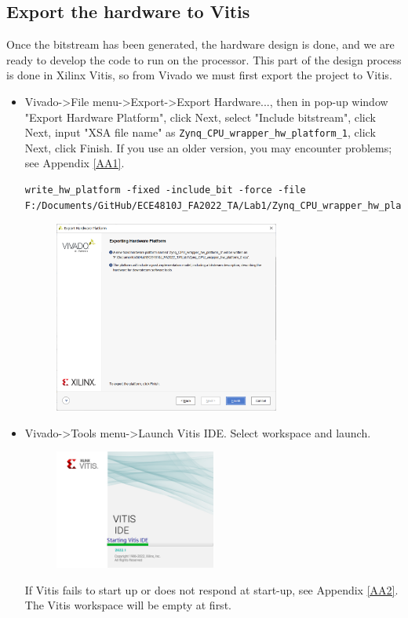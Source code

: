 \documentclass[a4paper,12pt,twoside]{article}
\begin{document}
\subsection{Export the hardware to Vitis}
Once the bitstream has been generated, the hardware design is done, and we are ready to develop the code to run on the processor. This part of the design process is done in Xilinx Vitis, so from Vivado we must first export the project to Vitis.
\begin{itemize}
    \item Vivado->File menu->Export->Export Hardware..., then in pop-up window "Export Hardware Platform", click Next, select "Include bitstream", click Next, input "XSA file name" as \texttt{Zynq\_CPU\_wrapper\_hw\_platform\_1}, click Next, click Finish. If you use an older version, you may encounter problems; see Appendix \ref{AA1}.
    \begin{verbatim}
write_hw_platform -fixed -include_bit -force -file F:/Documents/GitHub/ECE4810J_FA2022_TA/Lab1/Zynq_CPU_wrapper_hw_platform_1.xsa
    \end{verbatim}
    \begin{figure}[H]
        \centering
        \includegraphics[width=0.7\textwidth]{images/8.png}
    \end{figure}
    \item Vivado->Tools menu->Launch Vitis IDE. Select workspace and launch.
    \begin{figure}[H]
        \centering
        \includegraphics[width=0.5\textwidth]{images/9.png}
    \end{figure}
    If Vitis fails to start up or does not respond at start-up, see Appendix \ref{AA2}. The Vitis workspace will be empty at first.
\end{itemize}
\end{document}
